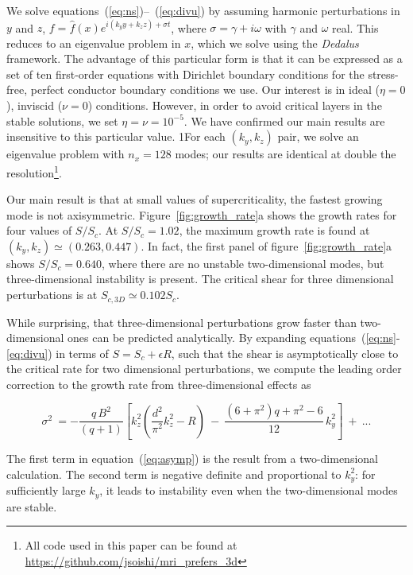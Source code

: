 \documentclass[aps,prl,reprint,superscriptaddress]{revtex4-1}
\newcommand{\SSC}{S/S_{c}}
\begin{document}
We solve equations~(\ref{eq:ns})--~(\ref{eq:divu}) by assuming harmonic perturbations in $y$ and $z$, $f = \hat{f}(x) e^{i(k_y y + k_z z) + \sigma t}$, where $\sigma = \gamma + i\omega$ with $\gamma$ and $\omega$ real. This reduces to an eigenvalue problem in $x$, which we solve using the \emph{Dedalus} framework. The advantage of this particular form is that it can be expressed as a set of ten first-order equations with Dirichlet boundary conditions for the stress-free, perfect conductor boundary conditions we use. 
Our interest is in ideal ($\eta = 0$), inviscid ($\nu = 0$) conditions.
However, in order to avoid critical layers in the stable solutions, we set $\eta=\nu=10^{-5}$.
We have confirmed our main results are insensitive to this particular value. 
1For each $(k_y, k_z)$ pair, we solve an eigenvalue problem with $n_x = 128$ modes; our results are identical at double the resolution\footnote{All code used in this paper can be found at \protect\url{https://github.com/jsoishi/mri\_prefers\_3d}}.


Our main result is that at small values of supercriticality, the fastest growing mode is not axisymmetric. 
Figure~\ref{fig:growth_rate}a shows the growth rates for four values of $\SSC$. 
At $\SSC = 1.02$, the maximum growth rate is found at $(k_y, k_z) \simeq (0.263, 0.447)$.
In fact, the first panel of figure~\ref{fig:growth_rate}a shows $\SSC = 0.640$, where there are no unstable two-dimensional modes, but three-dimensional instability is present.
The critical shear for three dimensional perturbations is at $S_{c,3D} \simeq 0.
102 S_c$.

While surprising, that three-dimensional perturbations grow faster than two-dimensional ones can be predicted analytically.
By expanding equations~(\ref{eq:ns}-\ref{eq:divu}) in terms of $S = S_c + \epsilon R$, such that the shear is asymptotically close to the critical rate for two dimensional perturbations, we compute the leading order correction to the growth rate from three-dimensional effects as
\begin{widetext}
\begin{equation}
  \label{eq:asymp}
\sigma^{2} \ = -\frac{q\,B^{2}}{(q+1)} \left[ k_z^2 \left(\frac{d^2}{\pi^{2}} k_z^2-R\right) \ - \ \frac{\left(6+\pi ^2\right) q+\pi
   ^2-6}{12 } \, k_{y}^{2}  \right] \ + \ ...
\end{equation}
\end{widetext}
The first term in equation~(\ref{eq:asymp}) is the result from a two-dimensional calculation.
The second term is negative definite and proportional to $k_y^2$: for sufficiently large $k_y$, it leads to instability even when the two-dimensional modes are stable.
\end{document}
